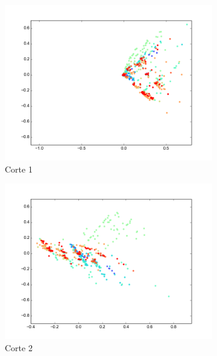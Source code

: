 \begin{figure}[H]
        \begin{subfigure}[b]{0.33\textwidth}
                \includegraphics[width=\linewidth]{secciones/graficos/oja/eje1_train.png}
                \caption{Corte 1}
                \label{fig: ej1_oja_eje_1_train}
        \end{subfigure}
        \begin{subfigure}[b]{0.33\textwidth}
                \includegraphics[width=\linewidth]{secciones/graficos/oja/eje2_train.png}
                \caption{Corte 2}
                \label{fig: ej1_oja_eje_2_train}
        \end{subfigure}
        \begin{subfigure}[b]{0.33\textwidth}

\end{subfigure}
\end{figure}
